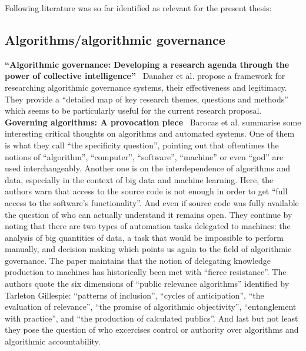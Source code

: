 \documentclass[pdftex,a4paper,11pt]{scrartcl}
\begin{document}
Following literature was so far identified as relevant for the present thesis:

\subsection{Algorithms/algorithmic governance}
\textbf{``Algorithmic governance: Developing a research agenda through the power of collective intelligence''}~\cite{DanaherEtAl2017}
\newline
\newline
Danaher et al. propose a framework for researching algorithmic governance systems, their effectiveness and legitimacy.
They provide a ``detailed map of key research themes, questions and methods'' which seems to be particularly useful for the current research proposal.
\newline
\newline
\textbf{Governing algorithms: A provocation piece}~\cite{BarHooZie2013}
\newline
\newline
Barocas et al. summarise some interesting critical thoughts on algorithms and automated systems.
One of them is what they call ``the specificity question'', pointing out that oftentimes the notions of ``algorithm'', ``computer'', ``software'', ``machine'' or even ``god'' are used interchangeably.
Another one is on the interdependence of algorithms and data, especially in the context of big data and machine learning.
Here, the authors warn that access to the source code is not enough in order to get ``full access to the software's functionality''.
And even if source code was fully available the question of who can actually understand it remains open.
They continue by noting that there are two types of automation tasks delegated to machines: the analysis of big quantities of data, a task that would be impossible to perform manually, and decision making which points us again to the field of algorithmic governance.
The paper maintains that the notion of delegating knowledge production to machines has historically been met with ``fierce resistance''.
The authors quote the six dimensions of ``public relevance algorithms'' identified by Tarleton Gillespie:
``patterns of inclusion'',
``cycles of anticipation'',
``the evaluation of relevance'',
``the promise of algorithmic objectivity'',
``entanglement with practice'',
and ``the production of calculated publics''.
And last but not least they pose the question of who excercises control or authority over algorithms and algorithmic accountability.
\end{document}

